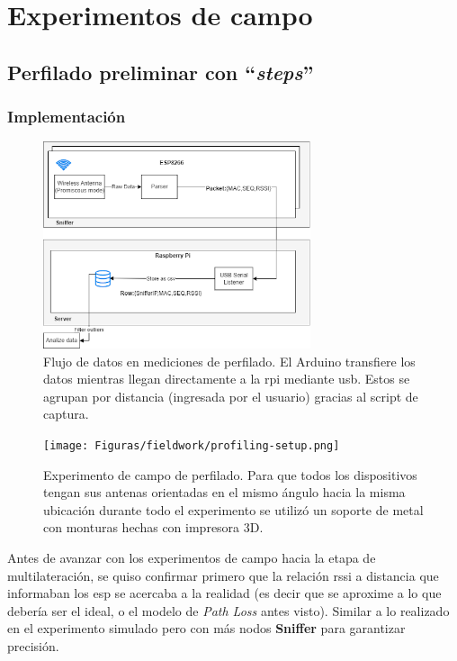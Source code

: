 \chapter{Experimentos de campo}

\label{Capitulo_4}
\label{ExperimentoReal}
\section{Perfilado preliminar con \textbf{“\textit{steps}”}}
\subsection{Implementación}
\begin{figure}[!htb]
	\centering
	\includegraphics[width=0.7\textwidth]{Figuras/infraestructure/arduino-rpi.png}
	\captionsetup{margin=2cm}
	\caption[Flujo de datos en mediciones de perfilado]{Flujo de datos en mediciones de perfilado. El Arduino transfiere los datos mientras llegan directamente a la \acs{rpi} mediante \acs{usb}. Estos se agrupan por distancia (ingresada por el usuario) gracias al script de captura.}
	\label{fig:infra-diagram-arduino}
\end{figure}
\begin{figure}[!htb]
	\centering
	\texttt{[image: Figuras/fieldwork/profiling-setup.png]}
	\captionsetup{margin=2cm}
	\caption[Perfilado]{Experimento de campo de perfilado. Para que todos los dispositivos tengan sus antenas orientadas en el
mismo ángulo hacia la misma ubicación durante todo el experimento se utilizó
un soporte de metal con monturas hechas con impresora 3D.}
	\label{fig:arduino-profiling-setup}
\end{figure}

Antes de avanzar con los experimentos de campo hacia la etapa de multilateración, se quiso confirmar primero que la relación \acs{rssi} a distancia que informaban los \acs{esp} se acercaba a la realidad (es decir que se aproxime a lo que debería ser el ideal, o el modelo de \textit{Path Loss} antes visto). Similar a lo realizado en el experimento simulado pero con más nodos \textbf{Sniffer} para garantizar precisión.

